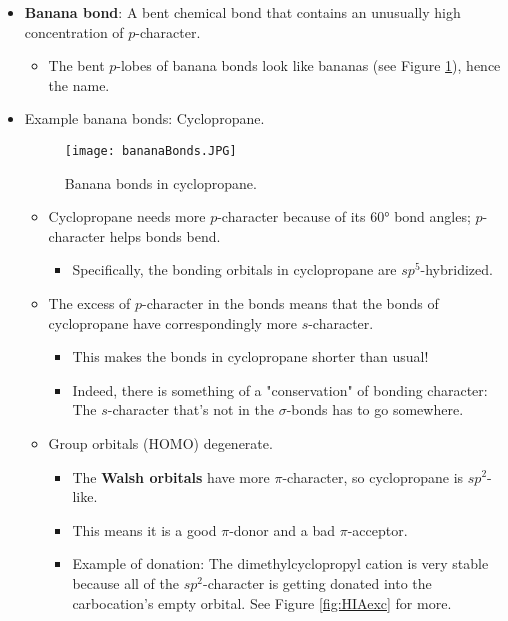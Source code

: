 \documentclass[../notes.tex]{subfiles}
\begin{document}
\begin{itemize}
    \item \textbf{Banana bond}: A bent chemical bond that contains an unusually high concentration of $p$-character.
    \begin{itemize}
        \item The bent $p$-lobes of banana bonds look like bananas (see Figure \ref{fig:bananaBonds}), hence the name.
    \end{itemize}
    \item Example banana bonds: Cyclopropane.
    \begin{figure}[h!]
        \centering
        \texttt{[image: bananaBonds.JPG]}
        \caption{Banana bonds in cyclopropane.}
        \label{fig:bananaBonds}
    \end{figure}
    \begin{itemize}
        \item Cyclopropane needs more $p$-character because of its \ang{60} bond angles; $p$-character helps bonds bend.
        \begin{itemize}
            \item Specifically, the  bonding orbitals in cyclopropane are $sp^5$-hybridized.
        \end{itemize}
        \item The excess of $p$-character in the  bonds means that the  bonds of cyclopropane have correspondingly more $s$-character.
        \begin{itemize}
            \item This makes the  bonds in cyclopropane shorter than usual!
            \item Indeed, there is something of a "conservation" of bonding character: The $s$-character that's not in the $\sigma$-bonds has to go somewhere.
        \end{itemize}
        \item Group orbitals (HOMO) degenerate.
        \begin{itemize}
            \item The \textbf{Walsh orbitals} have more $\pi$-character, so cyclopropane is $sp^2$-like.
            \item This means it is a good $\pi$-donor and a bad $\pi$-acceptor.
            \item Example of donation: The dimethylcyclopropyl cation is very stable because all of the $sp^2$-character is getting donated into the carbocation's empty orbital. See Figure \ref{fig:HIAexc} for more.

\end{itemize}
\end{itemize}
\end{itemize}
\end{document}
